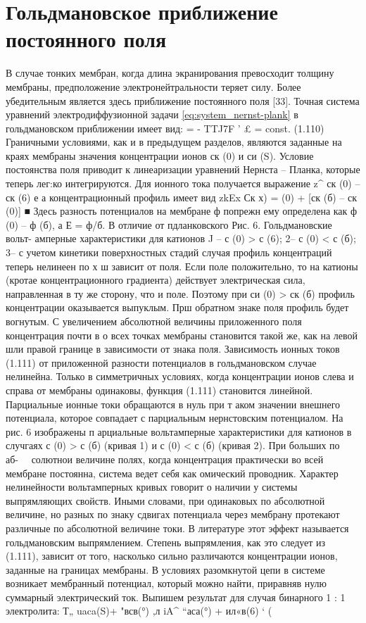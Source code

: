 \section{Гольдмановское приближение постоянного поля}
В случае тонких мембран, когда длина экранирования превосходит толщину мембраны, предположение электронейтральности теряет силу. Более убедительным является здесь приближение постоянного поля [33]. Точная система уравнений электродиффузионной задачи \eqref{eq:system_nernst-plank} в гольдмановском приближении имеет вид:
= - TTJ7F ’ £ = const. (1.110)
Граничными условиями, как и в предыдущем разделов, являются заданные на краях мембраны значения концентрации ионов ск (0) и си (S). Условие постоянства поля приводит к линеаризации уравнений Нернста -- Планка, которые теперь лег:ко интегрируются. Для ионного тока получается выражение
z\RTuk^ ск (0) -- ск (6) е
а концентрационный профиль имеет вид
zkEx
Ск {х) = (0) + [ск (б) -- ск (0)] ■
Здесь разность потенциалов на мембране ф попрежн ему определена как ф (0) -- ф (б), а Е = ф/б. В отличие от пдланковского
Рис. 6. Гольдмановские вольт- амперные характеристики для катионов
J -- с (0) > с (6);
2-- с (0) < с (б);
3-- с учетом кинетики поверхностных стадий
случая профиль концентраций теперь нелинеен по х ш зависит от поля. Если поле положительно, то на катионы (кротае концентрационного градиента) действует электрическая сила, направленная в ту же сторону, что и поле. Поэтому при си (0) > ск (б) профиль концентрации оказывается выпуклым. Прш обратном знаке поля профиль будет вогнутым. С увеличением абсолютной величины приложенного поля концентрация почти в о всех точках мембраны становится такой же, как на левой шли правой границе в зависимости от знака поля.
Зависимость ионных токов (1.111) от приложенной разности потенциалов в гольдмановском случае нелинейна. Только в симметричных условиях, когда концентрации ионов слева и справа от мембраны одинаковы, функция (1.111) становится линейной. Парциальные ионные токи обращаются в нуль при т аком значении внешнего потенциала, которое совпадает с парциальным нернстовским потенциалом. На рис. 6 изображены п арциальные вольтамперные характеристики для катионов в случгаях с (0) > с (б) (кривая 1) и с (0) < с (б) (кривая 2). При больших по аб- 
солютнои величине полях, когда концентрация практически во всей мембране постоянна, система ведет себя как омический проводник. Характер нелинейности вольтамперных кривых говорит о наличии у системы выпрямляющих свойств. Иными словами, при одинаковых по абсолютной величине, но разных по знаку сдвигах потенциала через мембрану протекают различные по абсолютной величине токи. В литературе этот эффект называется гольдмановским выпрямлением. Степень выпрямления, как это следует из (1.111), зависит от того, насколько сильно различаются концентрации ионов, заданные на границах мембраны.
В условиях разомкнутой цепи в системе возникает мембранный потенциал, который можно найти, приравняв нулю суммарный электрический ток. Выпишем результат для случая бинарного 1 : 1 электролита:
Т„ uaca(S)+ "всв(°) ,л iA^
“аса(°) + ил«в(6) ‘ ( }
